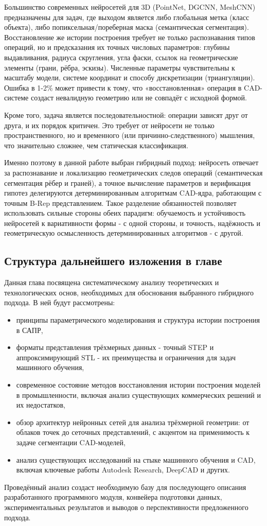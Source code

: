 Большинство современных нейросетей для 3D (PointNet, DGCNN, MeshCNN) предназначены для задач, где выходом является либо глобальная метка (класс объекта), либо попиксельная/пореберная маска (семантическая сегментация). Восстановление же истории построения требует не только распознавания типов операций, но и предсказания их точных числовых параметров: глубины выдавливания, радиуса скругления, угла фаски, ссылок на геометрические элементы (грани, рёбра, эскизы). Численные параметры чувствительны к масштабу модели, системе координат и способу дискретизации (триангуляции). Ошибка в 1-2\% может привести к тому, что «восстановленная» операция в CAD-системе создаст невалидную геометрию или не совпадёт с исходной формой.

Кроме того, задача является последовательностной: операции зависят друг от друга, и их порядок критичен. Это требует от нейросети не только пространственного, но и временного (или причинно-следственного) мышления, что значительно сложнее, чем статическая классификация.

Именно поэтому в данной работе выбран гибридный подход: нейросеть отвечает за распознавание и локализацию геометрических следов операций (семантическая сегментация рёбер и граней), а точное вычисление параметров и верификация гипотез делегируются детерминированным алгоритмам CAD-ядра, работающим с точным B-Rep представлением. Такое разделение обязанностей позволяет использовать сильные стороны обеих парадигм: обучаемость и устойчивость нейросетей к вариативности формы - с одной стороны, и точность, надёжность и геометрическую осмысленность детерминированных алгоритмов - с другой.

\subsection{Структура дальнейшего изложения в главе}

Данная глава посвящена систематическому анализу теоретических и технологических основ, необходимых для обоснования выбранного гибридного подхода. В ней будут рассмотрены:

\begin{itemize}
    \item принципы параметрического моделирования и структура истории построения в САПР,
    \item форматы представления трёхмерных данных - точный STEP и аппроксимирующий STL - их преимущества и ограничения для задач машинного обучения,
    \item современное состояние методов восстановления истории построения моделей в промышленности, включая анализ существующих коммерческих решений и их недостатков,
    \item обзор архитектур нейронных сетей для анализа трёхмерной геометрии: от облаков точек до сеточных представлений, с акцентом на применимость к задаче сегментации CAD-моделей,
    \item анализ существующих исследований на стыке машинного обучения и CAD, включая ключевые работы Autodesk Research, DeepCAD и других.
\end{itemize}

Проведённый анализ создаст необходимую базу для последующего описания разработанного программного модуля, конвейера подготовки данных, экспериментальных результатов и выводов о перспективности предложенного подхода.

